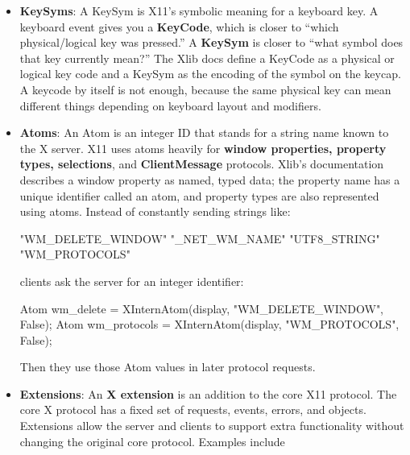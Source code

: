 \documentclass{report}
\begin{document}
\begin{itemize}
\begin{itemize}
            \end{itemize}
        \item \textbf{KeySyms}: A KeySym is X11’s symbolic meaning for a keyboard key.
            \bigbreak \noindent 
            A keyboard event gives you a \textbf{KeyCode}, which is closer to “which physical/logical key was pressed.” A \textbf{KeySym} is closer to “what symbol does that key currently mean?” The Xlib docs define a KeyCode as a physical or logical key code and a KeySym as the encoding of the symbol on the keycap.
            \bigbreak \noindent 
            A keycode by itself is not enough, because the same physical key can mean different things depending on keyboard layout and modifiers.
        \item \textbf{Atoms}: An Atom is an integer ID that stands for a string name known to the X server.
            \bigbreak \noindent 
            X11 uses atoms heavily for \textbf{window properties, property types, selections}, and \textbf{ClientMessage} protocols. Xlib’s documentation describes a window property as named, typed data; the property name has a unique identifier called an atom, and property types are also represented using atoms.
            \bigbreak \noindent 
            Instead of constantly sending strings like:
            \bigbreak \noindent 
            \begin{cppcode}
                "WM_DELETE_WINDOW"
                "_NET_WM_NAME"
                "UTF8_STRING"
                "WM_PROTOCOLS"
            \end{cppcode}
            \bigbreak \noindent 
            clients ask the server for an integer identifier:
            \bigbreak \noindent 
            \begin{cppcode}
                Atom wm_delete = XInternAtom(display, "WM_DELETE_WINDOW", False);
                Atom wm_protocols = XInternAtom(display, "WM_PROTOCOLS", False);
            \end{cppcode}
            \bigbreak \noindent 
            Then they use those Atom values in later protocol requests.
        \item \textbf{Extensions}: An \textbf{X extension} is an addition to the core X11 protocol. The core X protocol has a fixed set of requests, events, errors, and objects. Extensions allow the server and clients to support extra functionality without changing the original core protocol.
            \bigbreak \noindent 
            Examples include
            \bigbreak \noindent 
            \begin{cppcode}

\end{cppcode}
\end{itemize}
\end{document}
